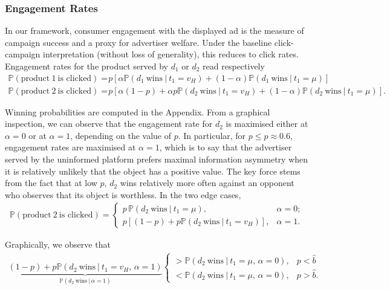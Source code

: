 \documentclass[11pt]{article}
\theoremstyle{plain}
\theoremstyle{definition}
\theoremstyle{plain}
\theoremstyle{plain}
\theoremstyle{plain}
\theoremstyle{plain}
\numberwithin{equation}{section}
\begin{document}
\vspace{0.4cm}

\subsubsection{Engagement Rates}

\noindent In our framework, consumer engagement with the displayed ad is the measure of campaign success and a proxy for advertiser welfare. Under the baseline click-campaign interpretation (without loss of generality), this reduces to click rates. Engagement rates for the product served by $d_1$ or $d_2$ read respectively
\begin{align*}
    \mathbb{P} (\text{product} \ 1 \ \text{is clicked}) =& p \left[  \alpha \mathbb{P}(d_1 \ \text{wins}\ | \ t_1 = v_H) + (1-\alpha)  \mathbb{P}(d_1 \ \text{wins}\ | \ t_1 = \mu) \right] \\[5pt]
    \mathbb{P} (\text{product} \ 2 \ \text{is clicked}) =& p \left[ \alpha (1 - p) + \alpha p \mathbb{P}(d_2 \ \textrm{wins} \ | \ t_1 = v_H) + (1 - \alpha) \mathbb{P}(d_2 \ \textrm{wins} \ | \ t_1 = \mu)  \right].
\end{align*}

\noindent Winning probabilities are computed in the Appendix. From a graphical inspection, we can observe that the engagement rate for $d_2$ is maximised either at $\alpha = 0$ or at $\alpha = 1$, depending on the value of $p$. In particular, for $p \leq \hat{p} \approx 0.6$, engagement rates are maximised at $\alpha = 1$, which is to say that the advertiser served by the uninformed platform prefers maximal information asymmetry when it is relatively unlikely that the object has a positive value. The key force stems from the fact that at low $p$, $d_2$ wins relatively more often against an opponent who observes that its object is worthless. In the two edge cases,
\begin{align*}
    \mathbb{P}(\text{product} \ 2 \ \text{is clicked}) = \begin{cases}
        p \,  \mathbb{P}(d_2 \ \textrm{wins} \ | \ t_1 = \mu),  & \alpha = 0; \\[5pt]
        p \left[(1 - p) + p \mathbb{P}(d_2 \ \textrm{wins} \ | \ t_1 = v_H)  \right], & \alpha = 1.
    \end{cases}
\end{align*}
\vspace{2mm}

\noindent Graphically, we observe that
\begin{align*}
    \underbrace{(1 - p) + p \mathbb{P}(d_2 \ \textrm{wins} \ | \ t_1 = v_H, \, \alpha = 1)}_{\mathbb{P}(d_2 \ \textrm{wins} \ | \ \alpha = 1)} \begin{cases}
        > \mathbb{P}(d_2 \ \textrm{wins} \ | \ t_1 = \mu, \, \alpha = 0), & p < \hat{b} \\[5pt]
        < \mathbb{P}(d_2 \ \textrm{wins} \ | \ t_1 = \mu,\, \alpha = 0), & p > \hat{b}.
    \end{cases}
\end{align*}
\vspace{2mm}
\end{document}
